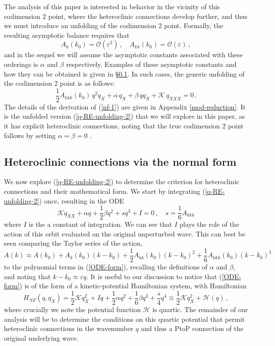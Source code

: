 \documentclass[10pt]{article}
\def\eps{{\varepsilon}} \def\reps{\textcolor{red}{{\varepsilon}}}
\begin{document}
The analysis of this paper is interested in behavior in the vicinity of this
codimension 2 point, where the heteroclinic connections develop further, and
thus we must introduce an unfolding of the codimension 2 point. Formally, the
resulting asymptotic balance requires that
%
\[
A_k(k_0) = \mathcal{O}(\eps^2)\,, \quad A_{kk}(k_0) = \mathcal{O}(\eps)\,,
\]
%
and in the sequel we will assume the asymptotic constants associated with these
orderings is $\alpha$ and $\beta$ respectively. Examples of these asymptotic
constants and how they can be obtained is given in
\S\ref{subsec-nf-solutions}. In such cases, the generic unfolding of the
codimension 2 point is as follows:
\begin{equation}\label{q-RE-unfolding-2}
\frac{1}{2} A_{kkk}(k_0)\, q^2q_X + \alpha\, q_X + \beta\, qq_X +\mathscr{K} \, q_{XXX} = 0\,.
\end{equation}
%
The details of the derivation of (\ref{nf-1}) are given in Appendix
\ref{mod-reduction}.  It is the unfolded version (\ref{q-RE-unfolding-2}) that
we will explore in this paper, as it has explicit heteroclinic connections, noting that the true
codimension 2 point follows by setting $\alpha = \beta = 0$ .

\subsection{Heteroclinic connections via the normal form}
\label{subsec-nf-solutions}

We now explore (\ref{q-RE-unfolding-2}) to determine the criterion for
heteroclinic connections and their mathematical form. We start by integrating
(\ref{q-RE-unfolding-2}) once, resulting in the ODE
%
\begin{equation}\label{ODE-form}
\mathscr{K} q_{XX} + \alpha q + \frac{1}{2}\beta q^2 + sq^3 + I =0\,, \quad s = \frac{1}{6}A_{kkk}
\end{equation}
%
where $I$ is the a constant of integration. We can see that $I$ plays the role
of the action of this orbit evaluated on the original unperturbed wave. This can
best be seen comparing the Taylor series of the action,
%
\[
A(k)\approx A(k_0)+A_{k}(k_0)(k-k_0)+\frac{1}{2}A_{kk}(k_0)(k-k_0)^2+\frac{1}{6}A_{kkk}(k_0)(k-k_0)^3
\]
%
to the polynomial terms in (\ref{ODE-form}), recalling the definitions of
$\alpha$ and $\beta$, and noting that $k-k_0\approx \eps q$. It is useful to our
discussion to notice that (\ref{ODE-form}) is of the form of a kinetic-potential
Hamiltonian system, with Hamiltonian
%
\[
H_{NF}(q,q_X) = \frac{1}{2}\mathscr{K} q_X^2+I q + \frac{1}{2}\alpha q^2 + \frac{1}{6}\beta q^3 + \frac{s}{4} q^4 \equiv \frac{1}{2}\mathscr{K} q_X^2+\mathcal{H}(q)\,,
\]
%
where crucially we note the potential function $\mathcal{H}$ is quartic. The
remainder of our analysis will be to determine the conditions on this quartic
potential that permit heteroclinic connections in the wavenumber $q$ and thus a
PtoP connection of the original underlying wave.
\end{document}
